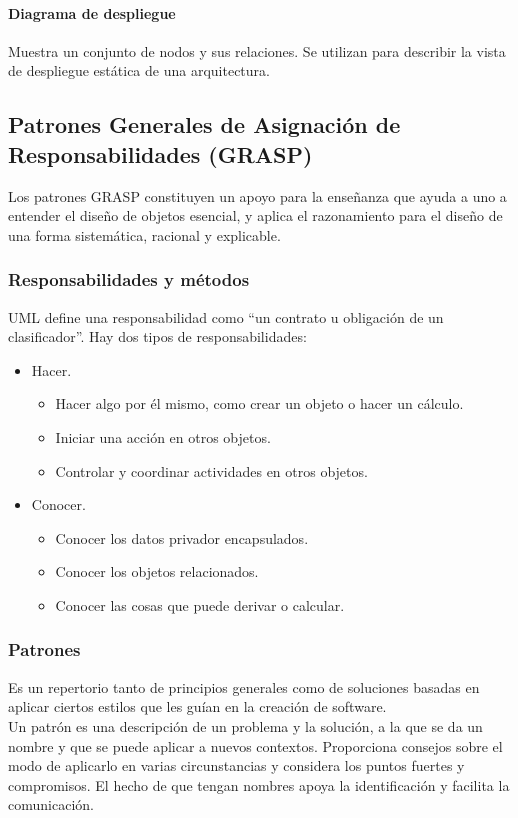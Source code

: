 \paragraph{Diagrama de despliegue}
Muestra un conjunto de nodos y sus relaciones. Se utilizan para describir la vista de despliegue estática de una arquitectura.
\subsection{Patrones Generales de Asignación de Responsabilidades (GRASP)}
Los patrones GRASP constituyen un apoyo para la enseñanza que ayuda a uno a entender el diseño de objetos esencial, y aplica el razonamiento para el diseño de una forma sistemática, racional y explicable.
\subsubsection{Responsabilidades y métodos}
UML define una responsabilidad como ``un contrato u obligación de un clasificador''. Hay dos tipos de responsabilidades:
\begin{itemize}
\item Hacer.
\begin{itemize}
\item Hacer algo por él mismo, como crear un objeto o hacer un cálculo.
\item Iniciar una acción en otros objetos.
\item Controlar y coordinar actividades en otros objetos.
\end{itemize}
\item Conocer.
\begin{itemize}
\item Conocer los datos privador encapsulados.
\item Conocer los objetos relacionados.
\item Conocer las cosas que puede derivar o calcular.
\end{itemize}
\end{itemize}
\subsubsection{Patrones}
Es un repertorio tanto de principios generales como de soluciones basadas en aplicar ciertos estilos que les guían en la creación de software.\\
Un patrón es una descripción de un problema y la solución, a la que se da un nombre y que se puede aplicar a nuevos contextos. Proporciona consejos sobre el modo de aplicarlo en varias circunstancias y considera los puntos fuertes y compromisos. El hecho de que tengan nombres apoya la identificación y facilita la comunicación.
